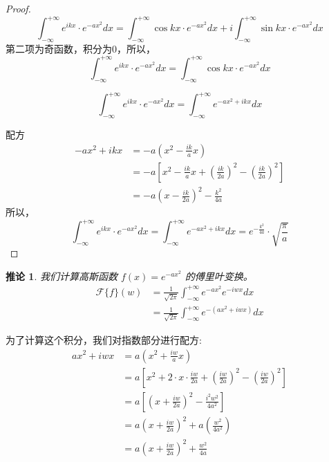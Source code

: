 \documentclass[12pt,a4paper]{article}
\numberwithin{subsection}{section}
\numberwithin{subsubsection}{subsection}
\theoremstyle{plain}
\newtheorem{corollary}[theorem]{推论}
\theoremstyle{definition}
\theoremstyle{remark}
\begin{document}
	\begin{proof}
		
		\begin{equation*}
			\int_{-\infty}^{+\infty} e^{ikx} \cdot e^{-a x^2} dx =\int_{-\infty}^{+\infty} \cos kx \cdot e^{-a x^2} dx+i\int_{-\infty}^{+\infty} \sin kx \cdot e^{-a x^2} dx
		\end{equation*}
		第二项为奇函数，积分为0，所以，
		\begin{equation*}
			\int_{-\infty}^{+\infty} e^{ikx} \cdot e^{-a x^2} dx =\int_{-\infty}^{+\infty} \cos kx \cdot e^{-a x^2} dx
		\end{equation*}
		
		\begin{equation*}
			\int_{-\infty}^{+\infty} e^{ikx} \cdot e^{-a x^2} dx = \int_{-\infty}^{+\infty} e^{-a x^2 + ikx} dx
		\end{equation*}
		
		配方
		\begin{equation*}
			\begin{split}
				-a x^2 + ikx &= -a \left( x^2 - \frac{ik}{a} x \right) \\
				&= -a \left[ x^2 - \frac{ik}{a} x + \left( \frac{ik}{2a} \right)^2 - \left( \frac{ik}{2a} \right)^2 \right] \\
				&= -a \left( x - \frac{ik}{2a} \right)^2 - \frac{k^2}{4a}
			\end{split}
		\end{equation*}
		所以，
		\begin{equation*}
			\int_{-\infty}^{+\infty} e^{ikx} \cdot e^{-a x^2} dx = \int_{-\infty}^{+\infty} e^{-a x^2 + ikx} dx	= e^{-\frac{k^2}{4a}} \cdot \sqrt{\frac{\pi}{a}}
		\end{equation*}
	\end{proof}
	
	\begin{corollary}
		我们计算高斯函数 $f(x) = e^{-ax^2}$ 的傅里叶变换。
		\begin{align*}
			\mathcal{F}\{f\}(w) &= \frac{1}{\sqrt{2\pi}} \int_{-\infty}^{+\infty} e^{-ax^2} e^{-iwx} dx \\
			&= \frac{1}{\sqrt{2\pi}} \int_{-\infty}^{+\infty} e^{-(ax^2 + iwx)} dx
		\end{align*}
	\end{corollary}
	
	
	为了计算这个积分，我们对指数部分进行配方:
	\begin{align*}
		ax^2 + iwx &= a\left(x^2 + \frac{iw}{a}x\right) \\
		&= a\left[ x^2 + 2 \cdot x \cdot \frac{iw}{2a} + \left(\frac{iw}{2a}\right)^2 - \left(\frac{iw}{2a}\right)^2 \right] \\
		&= a\left[ \left(x + \frac{iw}{2a}\right)^2 - \frac{i^2w^2}{4a^2} \right] \\
		&= a\left(x + \frac{iw}{2a}\right)^2 + a\left(\frac{w^2}{4a^2}\right) \\
		&= a\left(x + \frac{iw}{2a}\right)^2 + \frac{w^2}{4a}
	\end{align*}
	
\end{document}
